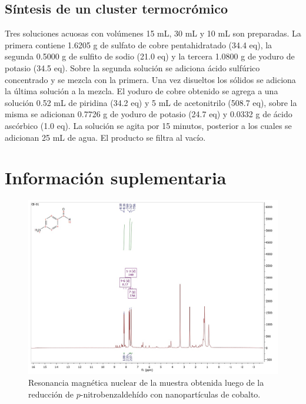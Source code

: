 \documentclass[fleqn,10pt]{SelfArx}
\begin{document}
\subsection{S\'intesis de un cluster termocr\'omico}
Tres soluciones acuosas con vol\'umenes 15 mL, 30 mL y 10 mL son preparadas. La primera contiene 1.6205 g de sulfato de cobre pentahidratado (34.4 eq), la segunda 0.5000 g de sulfito de sodio (21.0 eq) y la tercera 1.0800 g de yoduro de potasio (34.5 eq). Sobre la segunda soluci\'on se adiciona \'acido sulf\'urico concentrado y se mezcla con la primera. Una vez disueltos los s\'olidos se adiciona la \'ultima soluci\'on a la mezcla. El yoduro de cobre obtenido se agrega a una soluci\'on 0.52 mL de piridina (34.2 eq) y 5 mL de acetonitrilo (508.7 eq), sobre la misma se adicionan 0.7726 g de yoduro de potasio (24.7 eq) y 0.0332 g de \'acido asc\'orbico (1.0 eq). La soluci\'on se agita por 15 minutos, posterior a los cuales se adicionan 25 mL de agua. El producto se filtra al vac\'io.  




\newpage
\onecolumn
\section{Informaci\'on suplementaria}
\begin{figure}[h]
	\centering
	\includegraphics[width=\linewidth]{Structures/RMN.jpg}
	\caption{Resonancia magn\'etica nuclear de la muestra obtenida luego de la reducci\'on de $p$-nitrobenzaldeh\'ido con nanopart\'iculas de cobalto.}
	\label{fig: RMN}
\end{figure}
\end{document}
